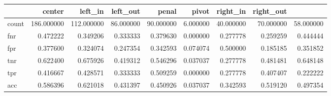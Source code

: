 \begin{tabular}{lrrrrrrrr}
\toprule
{} &      center &    left\_in &   left\_out &     penal &      pivot &   right\_in &  right\_out \\
\midrule
count &  186.000000 &  112.000000 &  86.000000 &  90.000000 &  6.000000 &  40.000000 &  70.000000 &  58.000000 \\
fnr   &    0.472222 &    0.349206 &   0.333333 &   0.379630 &  0.000000 &   0.277778 &   0.259259 &   0.444444 \\
fpr   &    0.377600 &    0.324074 &   0.247354 &   0.342593 &  0.074074 &   0.500000 &   0.185185 &   0.351852 \\
tnr   &    0.622400 &    0.675926 &   0.419312 &   0.546296 &  0.037037 &   0.277778 &   0.481481 &   0.648148 \\
tpr   &    0.416667 &    0.428571 &   0.333333 &   0.509259 &  0.000000 &   0.277778 &   0.407407 &   0.222222 \\
acc   &    0.586396 &    0.621018 &   0.431397 &   0.450926 &  0.037037 &   0.342593 &   0.519120 &   0.497354 \\
\bottomrule
\end{tabular}
